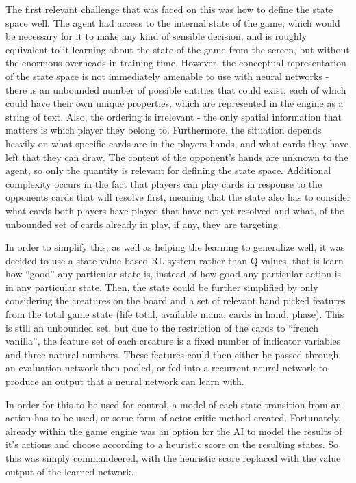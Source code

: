 The first relevant challenge that was faced on  this was how to define the state space well. The agent had access to the internal state of the game, which would be necessary for it to make any kind of sensible decision, and is roughly equivalent to it learning about the state of the game from the screen, but without the enormous overheads in training time. However, the conceptual representation of the state space is not immediately amenable to use with neural networks - there is an unbounded number of possible entities that could exist, each of which could have their own unique properties, which are represented in the engine as a string of text. Also, the ordering is irrelevant - the only spatial information that matters is which player they belong to. Furthermore, the situation depends heavily on what specific cards are in the players hands, and what cards they have left that they can draw. The content of the opponent's hands are unknown to the agent, so only the quantity is relevant for defining the state space. Additional complexity occurs in the fact that players can play cards in response to the opponents cards that will resolve first, meaning that the state also has to consider what cards both players have played that have not yet resolved and what, of the unbounded set of cards already in play, if any, they are targeting.

In order to simplify this, as well as helping the learning to generalize well, it was decided to use a state value based RL system rather than Q values, that is learn how ``good'' any particular state is, instead of how good any particular action is in any particular state. Then, the state could be further simplified by only considering the creatures on the board and a set of relevant hand picked features from the total game state (life total, available mana, cards in hand, phase). This is still an unbounded set, but due to the restriction of the cards to ``french vanilla'', the feature set of each creature is a fixed number of indicator variables and three natural numbers. These features could then either be passed through an evaluation network then pooled, or fed into a recurrent neural network to produce an output that a neural network can learn with. 

 In order for this to be used for control, a model of each state transition from an action has to be used, or some form of actor-critic method created. Fortunately, already within the game engine was an option for the AI to model the results of it's actions and choose according to a heuristic score on the resulting states. So this was simply commandeered, with the heuristic score replaced with the value output of the learned network.
 
